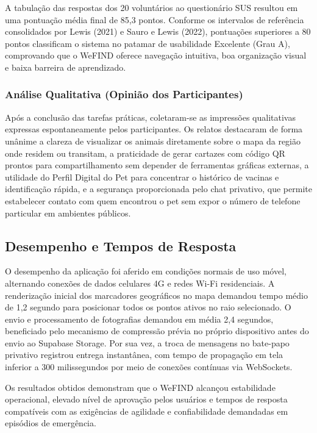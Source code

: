 A tabulação das respostas dos 20 voluntários ao questionário SUS resultou em uma pontuação média final de 85,3 pontos. Conforme os intervalos de referência consolidados por Lewis (2021) e Sauro e Lewis (2022), pontuações superiores a 80 pontos classificam o sistema no patamar de usabilidade Excelente (Grau A), comprovando que o WeFIND oferece navegação intuitiva, boa organização visual e baixa barreira de aprendizado.

\subsubsection{Análise Qualitativa (Opinião dos Participantes)}

Após a conclusão das tarefas práticas, coletaram-se as impressões qualitativas expressas espontaneamente pelos participantes. Os relatos destacaram de forma unânime a clareza de visualizar os animais diretamente sobre o mapa da região onde residem ou transitam, a praticidade de gerar cartazes com código QR prontos para compartilhamento sem depender de ferramentas gráficas externas, a utilidade do Perfil Digital do Pet para concentrar o histórico de vacinas e identificação rápida, e a segurança proporcionada pelo chat privativo, que permite estabelecer contato com quem encontrou o pet sem expor o número de telefone particular em ambientes públicos.

\subsection{Desempenho e Tempos de Resposta}

O desempenho da aplicação foi aferido em condições normais de uso móvel, alternando conexões de dados celulares 4G e redes Wi-Fi residenciais. A renderização inicial dos marcadores geográficos no mapa demandou tempo médio de 1,2 segundo para posicionar todos os pontos ativos no raio selecionado. O envio e processamento de fotografias demandou em média 2,4 segundos, beneficiado pelo mecanismo de compressão prévia no próprio dispositivo antes do envio ao Supabase Storage. Por sua vez, a troca de mensagens no bate-papo privativo registrou entrega instantânea, com tempo de propagação em tela inferior a 300 milissegundos por meio de conexões contínuas via WebSockets.

Os resultados obtidos demonstram que o WeFIND alcançou estabilidade operacional, elevado nível de aprovação pelos usuários e tempos de resposta compatíveis com as exigências de agilidade e confiabilidade demandadas em episódios de emergência.
\clearpage
